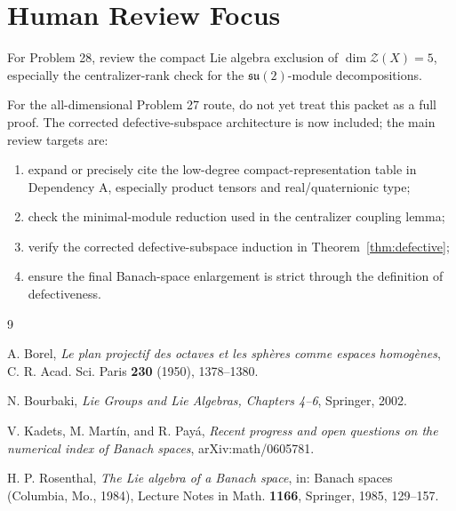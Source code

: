 \documentclass[11pt]{article}
\theoremstyle{remark}
\newcommand{\su}{\mathfrak{su}}
\begin{document}
\section*{Human Review Focus}

For Problem 28, review the compact Lie algebra exclusion of
\(\dim\mathcal Z(X)=5\), especially the centralizer-rank check for the
\(\su(2)\)-module decompositions.

For the all-dimensional Problem 27 route, do not yet treat this packet as a
full proof.  The corrected defective-subspace architecture is now included;
the main review targets are:
\begin{enumerate}
\item expand or precisely cite the low-degree compact-representation table in
Dependency A, especially product tensors and real/quaternionic type;
\item check the minimal-module reduction used in the centralizer coupling
lemma;
\item verify the corrected defective-subspace induction in
Theorem~\ref{thm:defective};
\item ensure the final Banach-space enlargement is strict through the
definition of defectiveness.
\end{enumerate}

\begin{thebibliography}{9}

A. Borel,
\emph{Le plan projectif des octaves et les sph\`eres comme espaces homog\`enes},
C. R. Acad. Sci. Paris \textbf{230} (1950), 1378--1380.

N. Bourbaki,
\emph{Lie Groups and Lie Algebras, Chapters 4--6},
Springer, 2002.

V. Kadets, M. Mart\'in, and R. Pay\'a,
\emph{Recent progress and open questions on the numerical index of Banach
spaces},
arXiv:math/0605781.

H. P. Rosenthal,
\emph{The Lie algebra of a Banach space},
in: Banach spaces (Columbia, Mo., 1984), Lecture Notes in Math.
\textbf{1166}, Springer, 1985, 129--157.

\end{thebibliography}
\end{document}
